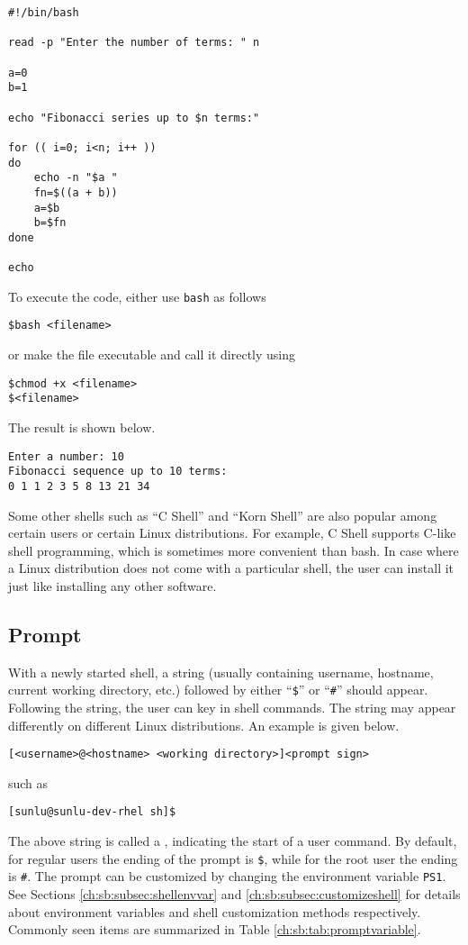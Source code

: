 \begin{lstlisting}
#!/bin/bash

read -p "Enter the number of terms: " n

a=0
b=1

echo "Fibonacci series up to $n terms:"

for (( i=0; i<n; i++ ))
do
    echo -n "$a "
    fn=$((a + b))
    a=$b
    b=$fn
done

echo
\end{lstlisting}

To execute the code, either use \verb|bash| as follows
\begin{lstlisting}
$bash <filename>
\end{lstlisting}
or make the file executable and call it directly using
\begin{lstlisting}
$chmod +x <filename>
$<filename>
\end{lstlisting}
The result is shown below.
\begin{lstlisting}
Enter a number: 10
Fibonacci sequence up to 10 terms:
0 1 1 2 3 5 8 13 21 34
\end{lstlisting}

Some other shells such as ``C Shell'' and ``Korn Shell'' are also popular among certain users or certain Linux distributions. For example, C Shell supports C-like shell programming, which is sometimes more convenient than bash. In case where a Linux distribution does not come with a particular shell, the user can install it just like installing any other software.

\subsection{Prompt}

With a newly started shell, a string (usually containing username, hostname, current working directory, etc.) followed by either ``\verb|$|'' or ``\verb|#|'' should appear. Following the string, the user can key in shell commands. The string may appear differently on different Linux distributions. An example is given below.
\begin{lstlisting}
[<username>@<hostname> <working directory>]<prompt sign>
\end{lstlisting}
such as
\begin{lstlisting}
[sunlu@sunlu-dev-rhel sh]$
\end{lstlisting}

The above string is called a , indicating the start of a user command. By default, for regular users the ending of the prompt is \verb|$|, while for the root user the ending is \verb|#|. The prompt can be customized by changing the environment variable \verb|PS1|. See Sections \ref{ch:sb:subsec:shellenvvar} and \ref{ch:sb:subsec:customizeshell} for details about environment variables and shell customization methods respectively. Commonly seen items are summarized in Table \ref{ch:sb:tab:promptvariable}.

